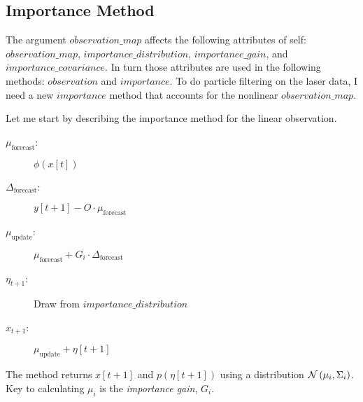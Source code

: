 \documentclass[12pt]{article}
\newcommand{\normal}[2]{{\cal N}\left(#1,#2 \right)}
\begin{document}
\subsection{Importance Method}
\label{sec:importance}

The argument $observation\_map$ affects the following attributes of
self: $observation\_map$, $importance\_distribution$,
$importance\_gain$, and $importance\_covariance$.  In turn those
attributes are used in the following methods: $observation$ and
$importance$.  To do particle filtering on the laser data, I need a
new $importance$ method that accounts for the nonlinear
$observation\_map$.

Let me start by describing the importance method for the linear
observation.
\begin{description}
\item[$\mu_{\text{forecast}}$:]  $\phi(x[t])$
\item[$\Delta_{\text{forecast}}$:] $y[t+1] - O \cdot \mu_{\text{forecast}}$
\item[$\mu_{\text{update}}$:]  $\mu_{\text{forecast}} + G_i \cdot
  \Delta_{\text{forecast}}$
\item[$\eta_{t+1}$:] Draw from $importance\_distribution$
\item[$x_{t+1}$:] $\mu_{\text{update}} + \eta[t+1]$
\end{description}
The method returns $x[t+1]$ and $p(\eta[t+1])$ using a distribution
$\normal{\mu_i}{\Sigma_i}$.  Key to calculating $\mu_i$ is the
\emph{importance gain}, $G_i$.
\end{document}
